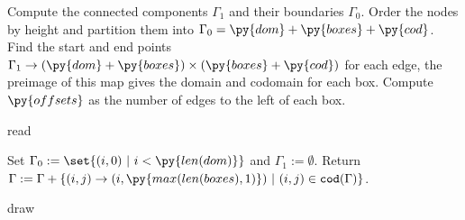 \vspace{-5pt}
\begin{algorithm}
\BlankLine
\DontPrintSemicolon
Compute the connected components $\Gamma_1$ and their boundaries $\Gamma_0$.\;
Order the nodes by height and partition them into $\Gamma_0 = \py{dom} + \py{boxes} + \py{cod}$.\;
Find the start and end points $\Gamma_1 \to (\py{dom} + \py{boxes}) \times (\py{boxes} + \py{cod})$ for each edge, the preimage of this map gives the domain and codomain for each box.\;
Compute $\py{offsets}$ as the number of edges to the left of each box.\;
\caption{read}
\end{algorithm}
\vspace{-22pt}
\begin{algorithm}
\BlankLine
\DontPrintSemicolon
Set $\Gamma_0 := \set{(i, 0) \ \vert \ i < \py{len(dom)}}$ and $\Gamma_1 := \emptyset$.\;
Return $\Gamma := \Gamma + \{(i, j) \to (i, \py{max(len(boxes), 1)}) \ \vert \ (i, j) \in \mathtt{cod}(\Gamma)\}$.
\caption{draw}
\end{algorithm}
